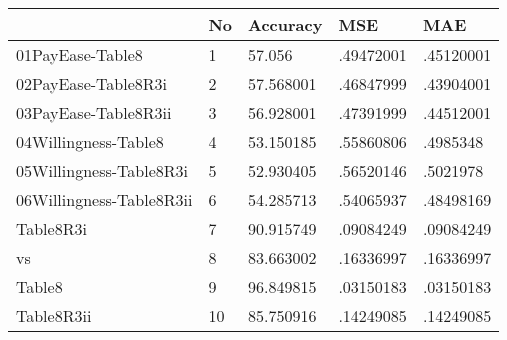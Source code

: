 \begin{table}[htbp]
\begin{tabular}{|l|l|l|l|l|}\hline  
 & No  & Accuracy  & MSE  & MAE  \\ \hline  
01PayEase-Table8 & 1 & 57.056 & .49472001 & .45120001 \\ \hline 
02PayEase-Table8R3i & 2 & 57.568001 & .46847999 & .43904001 \\ \hline 
03PayEase-Table8R3ii & 3 & 56.928001 & .47391999 & .44512001 \\ \hline 
04Willingness-Table8 & 4 & 53.150185 & .55860806 & .4985348 \\ \hline 
05Willingness-Table8R3i & 5 & 52.930405 & .56520146 & .5021978 \\ \hline 
06Willingness-Table8R3ii & 6 & 54.285713 & .54065937 & .48498169 \\ \hline 
Table8R3i & 7 & 90.915749 & .09084249 & .09084249 \\ \hline 
vs & 8 & 83.663002 & .16336997 & .16336997 \\ \hline 
Table8 & 9 & 96.849815 & .03150183 & .03150183 \\ \hline 
Table8R3ii & 10 & 85.750916 & .14249085 & .14249085 \\ \hline 
  \end{tabular}
\end{table}
